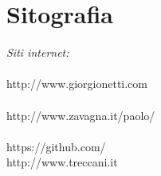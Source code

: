 
\chapter*{Sitografia}
\label{chp:Sitografia}
\textit{Siti internet:} \\
\\
http://www.giorgionetti.com \\
\\
http://www.zavagna.it/paolo/ \\
\\
https://github.com/
\\
http://www.treccani.it
\\